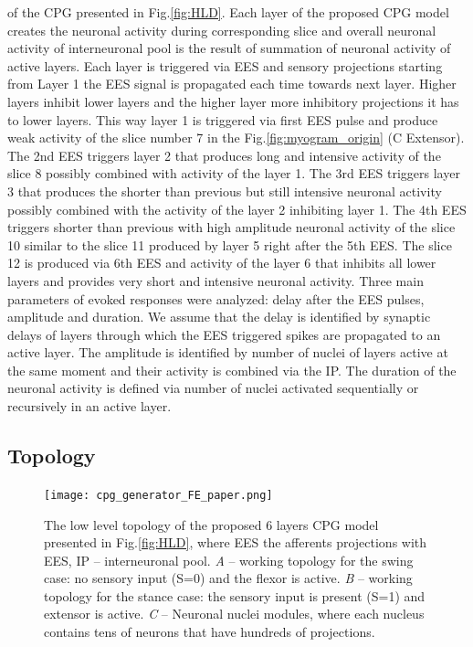 \documentclass[]{elsarticle}
\begin{document}
of the CPG presented in Fig.\ref{fig:HLD}.
Each layer of the proposed CPG model creates the neuronal activity during corresponding slice and overall neuronal activity of interneuronal pool is the result of summation of neuronal activity of active layers. Each layer is triggered via EES and sensory projections starting from Layer 1 the EES signal is propagated each time towards next layer. Higher layers inhibit lower layers and the higher layer more inhibitory projections it has to lower layers. This way layer 1 is triggered via first EES pulse and produce weak activity of the slice number 7 in the Fig.\ref{fig:myogram_origin} (C Extensor). The 2nd EES triggers layer 2 that produces long and intensive activity of the slice  8 possibly combined with activity of the layer 1. The 3rd EES triggers layer 3 that produces the shorter than previous but still intensive neuronal activity possibly combined with the activity of the layer 2 inhibiting layer 1. The 4th EES triggers shorter than previous with high amplitude neuronal activity of the slice 10 similar to the slice 11 produced by layer 5 right after the 5th  EES. The slice 12 is produced via 6th EES and activity of the layer 6 that inhibits all lower layers and provides very short and intensive neuronal activity. Three main parameters of evoked responses were analyzed: delay after the EES pulses, amplitude and duration. We assume that the delay is identified by synaptic delays of layers through which the EES triggered spikes are propagated to an active layer. The amplitude is identified by number of nuclei of layers active at the same moment and their activity is combined via the IP. The duration of the neuronal activity is defined via number of nuclei activated sequentially or recursively in an active layer.

\subsection{Topology}\label{sec:topology}

\begin{figure}[ht!]
	\centering
	\texttt{[image: cpg\_generator\_FE\_paper.png]}
	\caption{The low level topology of the proposed 6 layers CPG model presented in Fig.\ref{fig:HLD}, where EES the afferents projections with EES, IP -- interneuronal pool.
    \emph{A} -- working topology for the swing case: no sensory input (S=0) and the flexor is active. 
    \emph{B} -- working topology for the stance case: the sensory input is present (S=1) and extensor is active. 
    \emph{C} -- Neuronal nuclei modules, where each nucleus contains tens of neurons that have hundreds of projections.}
    \label{fig:cpg_low_level}
\end{figure}
\end{document}
